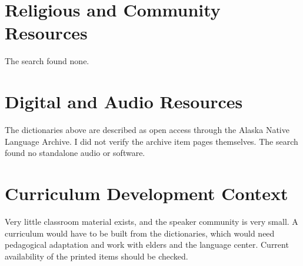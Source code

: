\documentclass[12pt]{article}
\begin{document}
\section{Religious and Community Resources}
The search found none.

\section{Digital and Audio Resources}
The dictionaries above are described as open access through the Alaska Native Language Archive. I did not verify the archive item pages themselves. The search found no standalone audio or software.

\section{Curriculum Development Context}
Very little classroom material exists, and the speaker community is very small. A curriculum would have to be built from the dictionaries, which would need pedagogical adaptation and work with elders and the language center. Current availability of the printed items should be checked.
\end{document}
